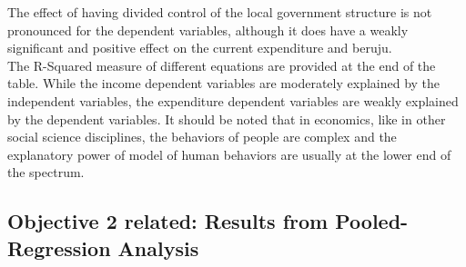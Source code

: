 The effect of having divided control of the local government structure is not pronounced for the dependent variables, although it does have a weakly significant and positive effect on the current expenditure and beruju.\\
The R-Squared measure of different equations are provided at the end of the table. While the income dependent variables are moderately explained by the independent variables, the expenditure dependent variables are weakly explained by the dependent variables. It should be noted that in economics, like in other social science disciplines, the behaviors of people are complex and the explanatory power of model of human behaviors are usually at the lower end of the spectrum.\\
\subsection{Objective 2 related: Results from Pooled-Regression Analysis}
